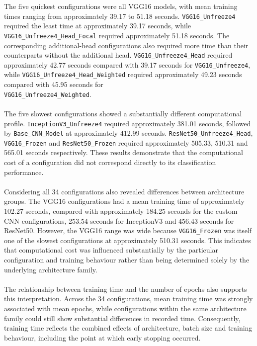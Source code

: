 \documentclass[12pt, a4paper]{report}
\begin{document}
				The five quickest configurations were all VGG16 models, with mean training times ranging from approximately 39.17 to 51.18 seconds. \texttt{VGG16\_Unfreeze4} required the least time at approximately 39.17 seconds, while \texttt{VGG16\_Unfreeze4\_Head\_Focal} required approximately 51.18 seconds. The corresponding additional-head configurations also required more time than their counterparts without the additional head. \texttt{VGG16\_Unfreeze4\_Head} required approximately 42.77 seconds compared with 39.17 seconds for \texttt{VGG16\_Unfreeze4}, while \texttt{VGG16\_Unfreeze4\_Head\_Weighted} required approximately 49.23 seconds compared with 45.95 seconds for \\\texttt{VGG16\_Unfreeze4\_Weighted}.\\\\
				The five slowest configurations showed a substantially different computational profile. \texttt{InceptionV3\_Unfreeze4} required approximately 381.01 seconds, followed by \texttt{Base\_CNN\_Model} at approximately 412.99 seconds. \texttt{ResNet50\_Unfreeze4\_Head}, \texttt{VGG16\_Frozen} and \texttt{ResNet50\_Frozen} required approximately 505.33, 510.31 and 565.01 seconds respectively. These results demonstrate that the computational cost of a configuration did not correspond directly to its classification performance.\\\\
				Considering all 34 configurations also revealed differences between architecture groups. The VGG16 configurations had a mean training time of approximately 102.27 seconds, compared with approximately 184.25 seconds for the custom CNN configurations, 253.54 seconds for InceptionV3 and 456.43 seconds for ResNet50. However, the VGG16 range was wide because \texttt{VGG16\_Frozen} was itself one of the slowest configurations at approximately 510.31 seconds. This indicates that computational cost was influenced substantially by the particular configuration and training behaviour rather than being determined solely by the underlying architecture family.\\\\
				The relationship between training time and the number of epochs also supports this interpretation. Across the 34 configurations, mean training time was strongly associated with mean epochs, while configurations within the same architecture family could still show substantial differences in recorded time. Consequently, training time reflects the combined effects of architecture, batch size and training behaviour, including the point at which early stopping occurred.
				
\end{document}
